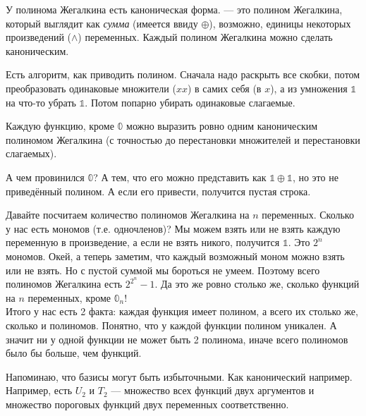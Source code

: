 \documentclass{article}
\begin{document}
\begin{itemize}
\begin{Comment}
        \end{Comment}
        \dfn У полинома Жегалкина есть каноническая форма.  --- это полином Жегалкина, который выглядит как \textit{сумма} (имеется ввиду $\oplus$), возможно, единицы некоторых произведений ($\land$) переменных.
        \thm Каждый полином Жегалкина можно сделать каноническим.
        \begin{Proof}
            Есть алгоритм, как приводить полином. Сначала надо раскрыть все скобки, потом преобразовать одинаковые множители ($xx$) в самих себя (в $x$), а из умножения $\mathbb1$ на что-то убрать $\mathbb1$. Потом попарно убирать одинаковые слагаемые.
        \end{Proof}
        \thm Каждую функцию, кроме $\mathbb0$ можно выразить ровно одним каноническим полиномом Жегалкина (с точностью до перестановки множителей и перестановки слагаемых).
        \begin{Comment}
            А чем провинился $\mathbb0$? А тем, что его можно представить как $\mathbb1\oplus\mathbb1$, но это не приведённый полином. А если его привести, получится пустая строка.
        \end{Comment}
        \begin{Proof}
            Давайте посчитаем количество полиномов Жегалкина на $n$ переменных. Сколько у нас есть мономов (т.е. одночленов)? Мы можем взять или не взять каждую переменную в произведение, а если не взять никого, получится $\mathbb1$. Это $2^n$ мономов. Окей, а теперь заметим, что каждый возможный моном можно взять или не взять. Но с пустой суммой мы бороться не умеем. Поэтому всего полиномов Жегалкина есть $2^{2^n}-1$. Да это же ровно столько же, сколько функций на $n$ переменных, кроме $\mathbb0_n$!\\
            Итого у нас есть 2 факта: каждая функция имеет полином, а всего их столько же, сколько и полиномов. Понятно, что у каждой функции полином уникален. А значит ни у одной функции не может быть 2 полинома, иначе всего полиномов было бы больше, чем функций.
        \end{Proof}
        \begin{Comment}
            Напоминаю, что базисы могут быть избыточными. Как канонический например. Например, есть $U_2$ и $T_2$ --- множество всех функций двух аргументов и множество пороговых функций двух переменных соответственно.
        \end{Comment}
        \begin{Comment}

\end{Comment}
\end{itemize}
\end{document}
